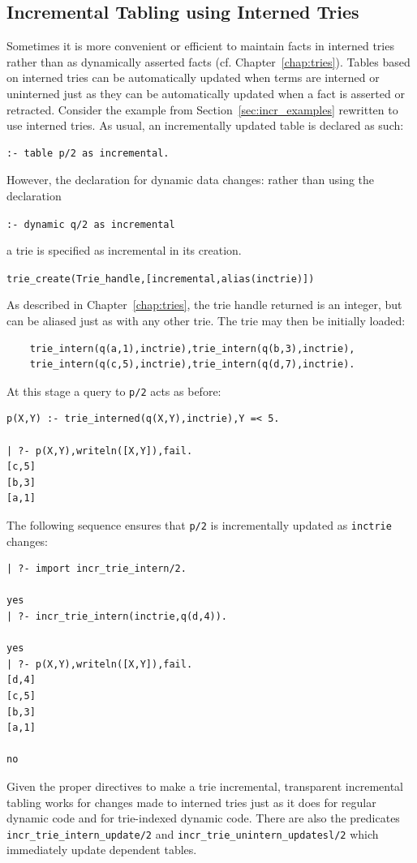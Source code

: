 \subsection{Incremental Tabling using Interned Tries} \label{sec:incr-update-tries}
%
Sometimes it is more convenient or efficient to maintain facts in
interned tries rather than as dynamically asserted facts
(cf. Chapter~\ref{chap:tries}).  Tables based on interned tries can be
automatically updated when terms are interned or uninterned just as
they can be automatically updated when a fact is asserted or
retracted.  Consider the example from Section~\ref{sec:incr_examples}
rewritten to use interned tries.  As usual, an incrementally updated
table is declared as such:
%
\begin{verbatim}
:- table p/2 as incremental.
\end{verbatim}
%
However, the declaration for dynamic data changes: rather than using
the declaration 
\begin{center}
{\tt :- dynamic q/2 as incremental}
\end{center}
a trie is specified as incremental in its creation.
%
\begin{center}
{\tt  trie\_create(Trie\_handle,[incremental,alias(inctrie)])}
\end{center}
%
As described in Chapter~\ref{chap:tries}, the trie handle returned is
an integer, but can be aliased just as with any other trie.  The trie
may then be initially loaded:
%
\begin{verbatim}
	trie_intern(q(a,1),inctrie),trie_intern(q(b,3),inctrie),
	trie_intern(q(c,5),inctrie),trie_intern(q(d,7),inctrie).
\end{verbatim}
%
At this stage a query to {\tt p/2} acts as before:
%
\begin{verbatim}
p(X,Y) :- trie_interned(q(X,Y),inctrie),Y =< 5.

| ?- p(X,Y),writeln([X,Y]),fail.
[c,5]
[b,3]
[a,1]
\end{verbatim}
%
The following sequence ensures that {\tt p/2} is incrementally updated
as {\tt inctrie} changes:
%
\begin{verbatim}
| ?- import incr_trie_intern/2.

yes
| ?- incr_trie_intern(inctrie,q(d,4)).

yes
| ?- p(X,Y),writeln([X,Y]),fail.
[d,4]
[c,5]
[b,3]
[a,1]

no
\end{verbatim}
%
Given the proper directives to make a trie incremental, transparent
incremental tabling works for changes made to interned tries just as
it does for regular dynamic code and for trie-indexed dynamic code.
There are also the predicates {\tt incr\_trie\_intern\_update/2} and
{\tt incr\_trie\_unintern\_updatesl/2} which immediately update
dependent tables.

